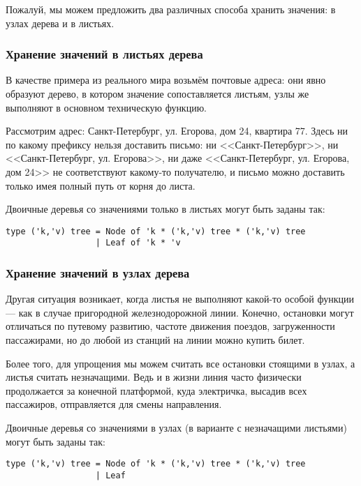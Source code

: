 \documentclass[12pt,a4paper,oneside]{book}
\begin{document}
Пожалуй, мы можем предложить два различных способа хранить
значения: в узлах дерева и в листьях.

\subsubsection{Хранение значений в листьях дерева}

В качестве примера из реального мира возьмём почтовые адреса:
они явно образуют дерево, в котором значение сопоставляется листьям, 
узлы же выполняют в основном техническую функцию.

Рассмотрим адрес: Санкт-Петербург, ул. Егорова, дом 24, квартира 77.
Здесь ни по какому префиксу нельзя доставить письмо: ни <<Санкт-Петербург>>, 
ни <<Санкт-Петербург, ул. Егорова>>, ни даже <<Санкт-Петербург, ул. Егорова, дом 24>> 
не соответствуют какому-то получателю, и письмо можно доставить только
имея полный путь от корня до листа.

Двоичные деревья со значениями только в листьях могут быть заданы так:

\begin{verbatim}
type ('k,'v) tree = Node of 'k * ('k,'v) tree * ('k,'v) tree 
                  | Leaf of 'k * 'v
\end{verbatim}

\subsubsection{Хранение значений в узлах дерева}

Другая ситуация возникает, когда листья не выполняют какой-то особой функции --- 
как в случае пригородной железнодорожной линии. Конечно, остановки могут отличаться 
по путевому развитию, частоте движения поездов, загруженности пассажирами,
но до любой из станций на линии можно купить билет.

Более того, для упрощения мы можем считать все остановки стоящими в узлах,
а листья считать незначащими. Ведь и в жизни линия часто физически продолжается 
за конечной платформой, куда электричка, высадив всех пассажиров, 
отправляется для смены направления.

Двоичные деревья со значениями в узлах (в варианте с незначащими листьями) 
могут быть заданы так:

\begin{verbatim}
type ('k,'v) tree = Node of 'k * ('k,'v) tree * ('k,'v) tree 
                  | Leaf
\end{verbatim}
\end{document}

